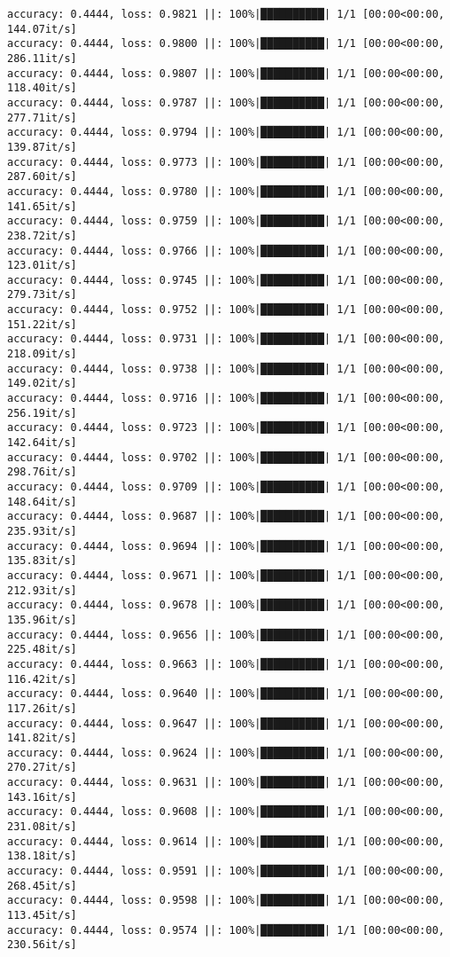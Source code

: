 \documentclass[
]{article}
\begin{document}
\begin{verbatim}
accuracy: 0.4444, loss: 0.9821 ||: 100%|██████████| 1/1 [00:00<00:00, 144.07it/s]
accuracy: 0.4444, loss: 0.9800 ||: 100%|██████████| 1/1 [00:00<00:00, 286.11it/s]
accuracy: 0.4444, loss: 0.9807 ||: 100%|██████████| 1/1 [00:00<00:00, 118.40it/s]
accuracy: 0.4444, loss: 0.9787 ||: 100%|██████████| 1/1 [00:00<00:00, 277.71it/s]
accuracy: 0.4444, loss: 0.9794 ||: 100%|██████████| 1/1 [00:00<00:00, 139.87it/s]
accuracy: 0.4444, loss: 0.9773 ||: 100%|██████████| 1/1 [00:00<00:00, 287.60it/s]
accuracy: 0.4444, loss: 0.9780 ||: 100%|██████████| 1/1 [00:00<00:00, 141.65it/s]
accuracy: 0.4444, loss: 0.9759 ||: 100%|██████████| 1/1 [00:00<00:00, 238.72it/s]
accuracy: 0.4444, loss: 0.9766 ||: 100%|██████████| 1/1 [00:00<00:00, 123.01it/s]
accuracy: 0.4444, loss: 0.9745 ||: 100%|██████████| 1/1 [00:00<00:00, 279.73it/s]
accuracy: 0.4444, loss: 0.9752 ||: 100%|██████████| 1/1 [00:00<00:00, 151.22it/s]
accuracy: 0.4444, loss: 0.9731 ||: 100%|██████████| 1/1 [00:00<00:00, 218.09it/s]
accuracy: 0.4444, loss: 0.9738 ||: 100%|██████████| 1/1 [00:00<00:00, 149.02it/s]
accuracy: 0.4444, loss: 0.9716 ||: 100%|██████████| 1/1 [00:00<00:00, 256.19it/s]
accuracy: 0.4444, loss: 0.9723 ||: 100%|██████████| 1/1 [00:00<00:00, 142.64it/s]
accuracy: 0.4444, loss: 0.9702 ||: 100%|██████████| 1/1 [00:00<00:00, 298.76it/s]
accuracy: 0.4444, loss: 0.9709 ||: 100%|██████████| 1/1 [00:00<00:00, 148.64it/s]
accuracy: 0.4444, loss: 0.9687 ||: 100%|██████████| 1/1 [00:00<00:00, 235.93it/s]
accuracy: 0.4444, loss: 0.9694 ||: 100%|██████████| 1/1 [00:00<00:00, 135.83it/s]
accuracy: 0.4444, loss: 0.9671 ||: 100%|██████████| 1/1 [00:00<00:00, 212.93it/s]
accuracy: 0.4444, loss: 0.9678 ||: 100%|██████████| 1/1 [00:00<00:00, 135.96it/s]
accuracy: 0.4444, loss: 0.9656 ||: 100%|██████████| 1/1 [00:00<00:00, 225.48it/s]
accuracy: 0.4444, loss: 0.9663 ||: 100%|██████████| 1/1 [00:00<00:00, 116.42it/s]
accuracy: 0.4444, loss: 0.9640 ||: 100%|██████████| 1/1 [00:00<00:00, 117.26it/s]
accuracy: 0.4444, loss: 0.9647 ||: 100%|██████████| 1/1 [00:00<00:00, 141.82it/s]
accuracy: 0.4444, loss: 0.9624 ||: 100%|██████████| 1/1 [00:00<00:00, 270.27it/s]
accuracy: 0.4444, loss: 0.9631 ||: 100%|██████████| 1/1 [00:00<00:00, 143.16it/s]
accuracy: 0.4444, loss: 0.9608 ||: 100%|██████████| 1/1 [00:00<00:00, 231.08it/s]
accuracy: 0.4444, loss: 0.9614 ||: 100%|██████████| 1/1 [00:00<00:00, 138.18it/s]
accuracy: 0.4444, loss: 0.9591 ||: 100%|██████████| 1/1 [00:00<00:00, 268.45it/s]
accuracy: 0.4444, loss: 0.9598 ||: 100%|██████████| 1/1 [00:00<00:00, 113.45it/s]
accuracy: 0.4444, loss: 0.9574 ||: 100%|██████████| 1/1 [00:00<00:00, 230.56it/s]

\end{verbatim}
\end{document}
